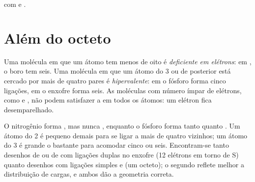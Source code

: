 \begin{omfigure}

{\small {} com  e .}
\end{omfigure}

\section{Além do octeto}

\begin{definition}\label{def:b1:lewis-resonance-vsepr:hypervalent}
Uma molécula em que um átomo tem menos de oito  é
\emph{deficiente em elétrons}: em , o boro
tem seis. Uma molécula em que um átomo do  3 ou de 
posterior está cercado por mais de quatro pares é
\emph{hipervalente}: em
 o fósforo forma cinco ligações, em  o enxofre forma seis.
As moléculas com número ímpar de elétrons, como  e , não
podem satisfazer a  em todos os átomos: um elétron fica
desemparelhado.
\end{definition}

\begin{remark}\label{rem:b1:lewis-resonance-vsepr:hypervalent}
O nitrogênio forma , mas nunca , enquanto o fósforo forma
tanto  quanto . Um átomo do  2 é pequeno demais
para se ligar a mais de quatro vizinhos; um átomo do  3 é grande
o bastante para acomodar cinco ou seis. Encontram-se tanto desenhos de
 ou de  com ligações duplas no enxofre (12
elétrons em torno de S) quanto desenhos com ligações simples e  (um octeto); o segundo reflete melhor a distribuição de cargas,
e ambos dão a geometria correta.
\end{remark}

